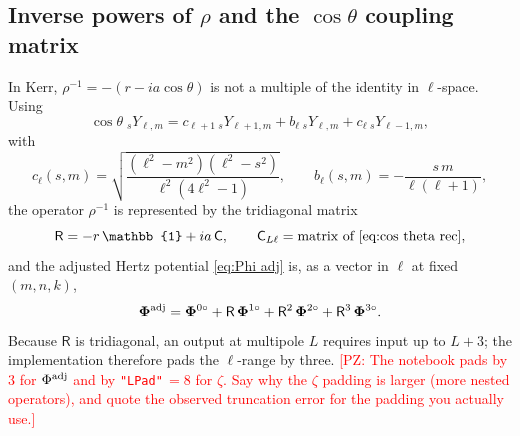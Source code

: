 \documentclass[preprint,aps,nofootinbib,a4paper,superscriptaddress,longbibliography,amsfonts, amssymb,amsmath,titlepage]{revtex4-1}
\numberwithin{equation}{section} %
\newcommand{\PZ}[1]{\textcolor{red}{\textsf{[PZ: #1]}}}
\newcommand{\emm}{m}
\def\l{\ensuremath{\ell}}
\def\Phiadj{\Phi^{\rm adj}}
\newcommand{\sYY}[3]{{}_{#1}Y_{#2,#3}}
\begin{document}
\subsection{Inverse powers of $\rho$ and the $\cos\theta$ coupling matrix}
\label{sec:cos theta}
In Kerr, $\rho^{-1} = -(r-ia\cos\theta)$ is not a multiple of the identity in
$\l$-space.  Using
\begin{equation}\label{eq:cos theta rec}
\cos\theta\;\sYY{s}{\l}{\emm}
=
c_{\l+1}\,\sYY{s}{\l+1}{\emm}
+b_{\l}\,\sYY{s}{\l}{\emm}
+c_{\l}\,\sYY{s}{\l-1}{\emm},
\end{equation}
with
\begin{equation}\label{eq:cos theta coeffs}
c_{\l}(s,\emm)=\sqrt{\frac{(\l^{2}-\emm^{2})(\l^{2}-s^{2})}{\l^{2}(4\l^{2}-1)}},
\qquad
b_{\l}(s,\emm)=-\frac{s\,\emm}{\l(\l+1)},
\end{equation}
the operator $\rho^{-1}$ is represented by the tridiagonal matrix
\begin{equation}\label{eq:R matrix}
\mathsf R = -r\,\mathbb{1} + i a\,\mathsf C,
\qquad
\mathsf C_{L\l} = \text{matrix of \eqref{eq:cos theta rec}},
\end{equation}
and the adjusted Hertz potential \eqref{eq:Phi adj} is, as a vector in $\l$
at fixed $(\emm,n,k)$,
\begin{equation}\label{eq:Phi adj vector}
\boldsymbol{\Phi}^{\rm adj}
=
\boldsymbol{\Phi}^{0\circ}
+\mathsf R\,\boldsymbol{\Phi}^{1\circ}
+\mathsf R^{2}\,\boldsymbol{\Phi}^{2\circ}
+\mathsf R^{3}\,\boldsymbol{\Phi}^{3\circ}.
\end{equation}
Because $\mathsf R$ is tridiagonal, an output at multipole $L$ requires input
up to $L+3$; the implementation therefore pads the $\l$-range by three.
\PZ{The notebook pads by 3 for $\Phiadj$ and by \texttt{"LPad"}$\,=8$ for
$\zeta$.  Say why the $\zeta$ padding is larger (more nested operators), and
quote the observed truncation error for the padding you actually use.}
\end{document}
